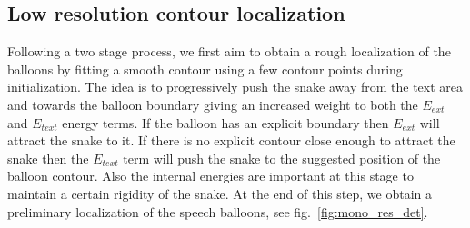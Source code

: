 \documentclass[conference]{IEEEtran}
\begin{document}
\subsection{Low resolution contour localization}
Following a two stage process, we first aim to obtain a rough localization of the balloons by fitting a smooth contour using a few contour points during initialization. The idea is to progressively push the snake away from the text area and towards the balloon boundary giving an increased weight to both the $E_{ext}$ and $E_{text}$ energy terms. If the balloon has an explicit boundary then $E_{ext}$ will attract the snake to it. If there is no explicit contour close enough to attract the snake then the $E_{text}$ term will push the snake to the suggested position of the balloon contour. Also the internal energies are important at this stage to maintain a certain rigidity of the snake.
At the end of this step, we obtain a preliminary localization of the speech balloons, see fig.~\ref{fig:mono_res_det}. 
\end{document}

